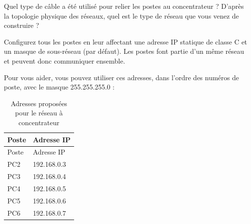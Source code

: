 \documentclass[
  french,
  10pt,
  a4paper,
]{scrartcl}
\begin{document}
\begin{tcolorbox}[enhanced jigsaw, arc=.35mm, bottomrule=.15mm, bottomtitle=1mm, breakable, colback=white, colbacktitle=quarto-callout-note-color!10!white, colframe=quarto-callout-note-color-frame, coltitle=black, left=2mm, leftrule=.75mm, opacityback=0, opacitybacktitle=0.6, rightrule=.15mm, title=\textcolor{quarto-callout-note-color}{\faInfo}\hspace{0.5em}{Question 5}, titlerule=0mm, toprule=.15mm, toptitle=1mm]

Quel type de câble a été utilisé pour relier les postes au concentrateur
? D'après la topologie physique des réseaux, quel est le type de réseau
que vous venez de construire ?

\end{tcolorbox}

\begin{tcolorbox}[enhanced jigsaw, arc=.35mm, bottomrule=.15mm, bottomtitle=1mm, breakable, colback=white, colbacktitle=quarto-callout-note-color!10!white, colframe=quarto-callout-note-color-frame, coltitle=black, left=2mm, leftrule=.75mm, opacityback=0, opacitybacktitle=0.6, rightrule=.15mm, title=\textcolor{quarto-callout-note-color}{\faInfo}\hspace{0.5em}{Question 6}, titlerule=0mm, toprule=.15mm, toptitle=1mm]

Configurez tous les postes en leur affectant une adresse IP statique de
classe C et un masque de sous-réseau (par défaut). Les postes font
partie d'un même réseau et peuvent donc communiquer ensemble.

\end{tcolorbox}

Pour vous aider, vous pouvez utiliser ces adresses, dans l'ordre des
numéros de poste, avec le masque 255.255.255.0 :

\begin{longtable}[]{@{}ll@{}}
\caption{Adresses proposées pour le réseau à
concentrateur}\label{tbl-adresses-hub}\tabularnewline
\toprule\noalign{}
Poste & Adresse IP \\
\midrule\noalign{}
\endfirsthead
\toprule\noalign{}
Poste & Adresse IP \\
\midrule\noalign{}
\endhead
\bottomrule\noalign{}
\endlastfoot
PC2 & 192.168.0.3 \\
PC3 & 192.168.0.4 \\
PC4 & 192.168.0.5 \\
PC5 & 192.168.0.6 \\
PC6 & 192.168.0.7 \\
\end{longtable}
\end{document}
